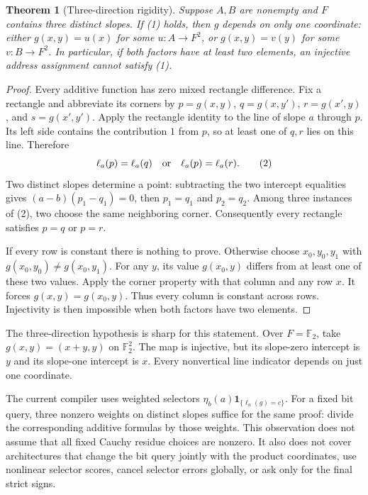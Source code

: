 \documentclass[11pt]{article}
\newtheorem{theorem}{Theorem}
\begin{document}
\begin{theorem}[Three-direction rigidity]
Suppose $A,B$ are nonempty and $F$ contains three distinct slopes.
If (1) holds, then $g$ depends on only one coordinate: either
$g(x,y)=u(x)$ for some $u:A\to F^2$, or $g(x,y)=v(y)$ for some
$v:B\to F^2$. In particular, if both factors have at least two elements,
an injective address assignment cannot satisfy (1).
\end{theorem}
\begin{proof}
Every additive function has zero mixed rectangle difference. Fix a
rectangle and abbreviate its corners by $p=g(x,y)$, $q=g(x,y')$,
$r=g(x',y)$, and $s=g(x',y')$. Apply the rectangle identity to the line
of slope $a$ through $p$. Its left side contains the contribution $1$
from $p$, so at least one of $q,r$ lies on this line. Therefore
\[
 \ell_a(p)=\ell_a(q)\quad\hbox{or}\quad\ell_a(p)=\ell_a(r).
 \tag{2}
\]
Two distinct slopes determine a point: subtracting the two intercept
equalities gives $(a-b)(p_1-q_1)=0$, then $p_1=q_1$ and $p_2=q_2$.
Among three instances of (2), two choose the same neighboring corner.
Consequently every rectangle satisfies $p=q$ or $p=r$.

If every row is constant there is nothing to prove. Otherwise choose
$x_0,y_0,y_1$ with $g(x_0,y_0)\ne g(x_0,y_1)$. For any $y$, its value
$g(x_0,y)$ differs from at least one of these two values. Apply the
corner property with that column and any row $x$. It forces
$g(x,y)=g(x_0,y)$. Thus every column is constant across rows.
Injectivity is then impossible when both factors have two elements.
\end{proof}

The three-direction hypothesis is sharp for this statement. Over
$F=\mathbb F_2$, take $g(x,y)=(x+y,y)$ on $\mathbb F_2^2$. The map is
injective, but its slope-zero intercept is $y$ and its slope-one intercept
is $x$. Every nonvertical line indicator depends on just one coordinate.

The current compiler uses weighted selectors
$\eta_b(a)\mathbf1_{\{\ell_a(g)=c\}}$. For a fixed bit query, three
nonzero weights on distinct slopes suffice for the same proof: divide
the corresponding additive formulas by those weights. This observation
does not assume that all fixed Cauchy residue choices are nonzero.
It also does not cover architectures that change the bit query jointly
with the product coordinates, use nonlinear selector scores, cancel
selector errors globally, or ask only for the final strict signs.
\end{document}
